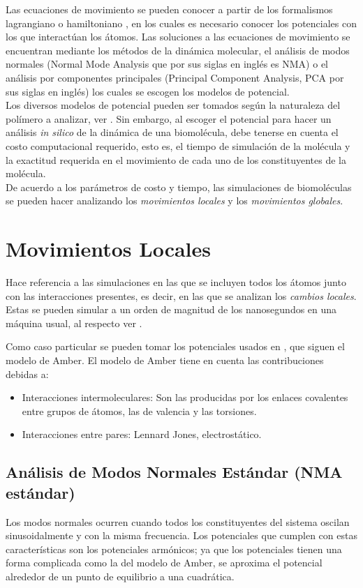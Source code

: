 Las ecuaciones de movimiento se pueden conocer a partir de los formalismos lagrangiano o hamiltoniano \cite{Goldstein2001}, en los cuales es necesario conocer los potenciales con los que interact\'{u}an los \'{a}tomos. Las soluciones a las ecuaciones de movimiento se encuentran mediante los m\'{e}todos de la din\'{a}mica molecular, el an\'{a}lisis de modos normales (Normal Mode Analysis que por sus siglas en ingl\'{e}s es NMA) o el an\'{a}lisis por componentes principales (Principal Component Analysis, PCA por sus siglas en ingl\'{e}s) los cuales se escogen los modelos de potencial.\\

Los diversos modelos de potencial pueden ser tomados seg\'{u}n la naturaleza del pol\'{i}mero a analizar, ver \cite{Lezon2009}. Sin embargo, al escoger el potencial  para hacer un an\'{a}lisis \textit{in silico} de la din\'{a}mica de una biomol\'{e}cula, debe tenerse en cuenta el costo computacional requerido, esto es, el tiempo de simulaci\'{o}n de la mol\'{e}cula y la exactitud requerida en el movimiento de cada uno de los constituyentes de la mol\'{e}cula.\\

De acuerdo a los par\'{a}metros de costo y tiempo, las simulaciones de biomol\'{e}culas se pueden hacer analizando los \textit{movimientos locales} y los \textit{movimientos globales}.
\section{Movimientos Locales}
Hace referencia a las simulaciones en las que se incluyen todos los \'{a}tomos junto con las interacciones presentes, es decir, en las que se analizan los \textit{cambios locales}. Estas se pueden simular a un orden de magnitud de los nanosegundos en una m\'{a}quina usual, al respecto ver \cite{Gur2013}.

Como caso particular se pueden tomar los potenciales usados en \cite{Amber2016}, que siguen el modelo de Amber. El modelo de Amber tiene en cuenta las contribuciones debidas a:
 \begin{itemize}
\item Interacciones intermoleculares: Son las producidas por los enlaces covalentes entre grupos de \'{a}tomos, las de valencia y las torsiones.
\item Interacciones entre pares: Lennard Jones, electrost\'{a}tico.
\end{itemize}
\subsection{An\'{a}lisis de Modos Normales Est\'{a}ndar (NMA est\'{a}ndar)}
Los modos normales ocurren cuando todos los constituyentes del sistema oscilan sinusoidalmente y con la misma frecuencia. Los potenciales que cumplen con estas caracter\'{i}sticas son los potenciales arm\'{o}nicos; ya que los potenciales tienen una forma complicada como la del modelo de Amber, se aproxima el potencial alrededor de un punto de equilibrio a una cuadr\'{a}tica.\\

